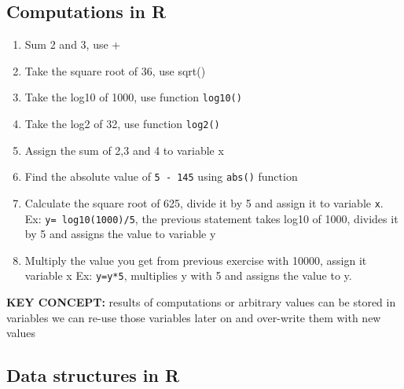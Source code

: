 \documentclass[12pt,]{krantz}
\theoremstyle{definition}
\theoremstyle{definition}
\theoremstyle{definition}
\theoremstyle{remark}
\begin{document}
\hypertarget{computations-in-r-1}{%
\subsection{Computations in R}\label{computations-in-r-1}}

\begin{enumerate}
\def\labelenumi{\arabic{enumi}.}
\item
  Sum 2 and 3, use +
\item
  Take the square root of 36, use sqrt()
\item
  Take the log10 of 1000, use function \texttt{log10()}
\item
  Take the log2 of 32, use function \texttt{log2()}
\item
  Assign the sum of 2,3 and 4 to variable x
\item
  Find the absolute value of \texttt{5\ -\ 145} using \texttt{abs()}
  function
\item
  Calculate the square root of 625, divide it by 5 and assign it to
  variable \texttt{x}. Ex: \texttt{y=\ log10(1000)/5}, the previous
  statement takes log10 of 1000, divides it by 5 and assigns the value
  to variable y
\item
  Multiply the value you get from previous exercise with 10000, assign
  it variable x Ex: \texttt{y=y*5}, multiplies y with 5 and assigns the
  value to y.
\end{enumerate}

\textbf{KEY CONCEPT:} results of computations or arbitrary values can be
stored in variables we can re-use those variables later on and
over-write them with new values

\hypertarget{data-structures-in-r}{%
\subsection{Data structures in R}\label{data-structures-in-r}}
\end{document}
